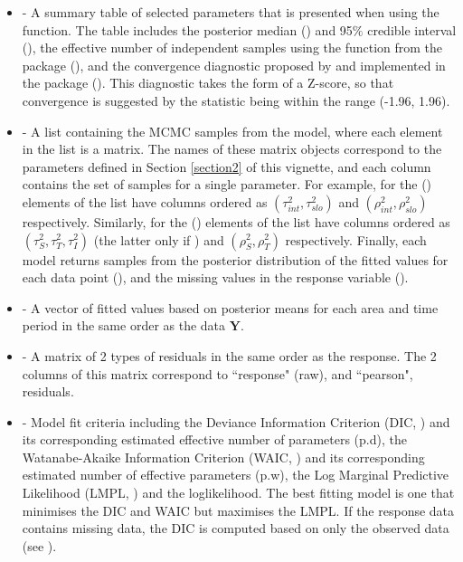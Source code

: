 \documentclass[article, nojss]{jss}
\begin{document}
\begin{itemize}
\item {} - A summary table of selected parameters that is presented when using the  function. The table includes the posterior median () and 95$\%$ credible interval (),  the effective number of independent samples using the   function from the  package (), and the convergence  diagnostic proposed by \cite{geweke1992} and implemented in the  package (). This diagnostic takes the form of a Z-score, so that convergence is suggested by the statistic being within the range (-1.96, 1.96).

\item {} - A list containing the MCMC samples from the model, where each element in the list is a matrix. The names of these matrix objects correspond to the parameters defined in Section \ref{section2} of this vignette, and each column contains the set of samples for a single parameter.  For example, for  the () elements of the list have columns ordered as $(\tau^2_{int}, \tau^2_{slo})$ and $(\rho^2_{int}, \rho^2_{slo})$ respectively. Similarly, for   the () elements of the list have columns ordered as $(\tau^2_{S}, \tau^2_{T}, \tau^2_{I})$ (the latter only if ) and $(\rho^2_{S}, \rho^2_{T})$ respectively. Finally, each model returns samples from the posterior distribution of the fitted values for each data point (), and the missing values in the response variable ().

\item {} - A vector of fitted values based on posterior means for each area and time period in the same order as the data $\mathbf{Y}$.

\item {} - A matrix of 2 types of residuals in the same order as the response. The 2 columns of this matrix correspond to ``response" (raw), and ``pearson", residuals.

\item {} - Model fit criteria including the Deviance Information Criterion (DIC, \citealp{spiegelhalter2002}) and its corresponding estimated effective number of parameters (p.d), the Watanabe-Akaike Information Criterion (WAIC, \citealp{watanabe2010}) and its corresponding estimated number of effective parameters (p.w), the Log Marginal Predictive Likelihood (LMPL, \citealp{congdon2005}) and the loglikelihood. The best fitting model is one that minimises the DIC and WAIC but maximises the LMPL. If the response data contains missing data, the DIC is computed based on only the observed data (see \cite{celeux2006}).


\end{itemize}
\end{document}
